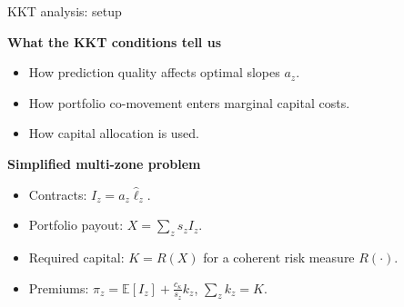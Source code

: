 \documentclass{beamer}
\begin{document}
    \begin{frame}{KKT analysis: setup}
      \small

      \textbf{What the KKT conditions tell us}
      \begin{itemize}\itemsep2pt
          \item How prediction quality affects optimal slopes $a_z$.
          \item How portfolio co-movement enters marginal capital costs.
          \item How capital allocation is used.
      \end{itemize}

      \medskip

      \textbf{Simplified multi-zone problem}
      \begin{itemize}\itemsep2pt
          \item Contracts: $I_z = a_z \hat{\ell}_z$.
          \item Portfolio payout: $X = \sum_z s_z I_z$.
          \item Required capital: $K = R(X)$ for a coherent risk measure $R(\cdot)$.
          \item Premiums: $\pi_z = \mathbb{E}[I_z] + \frac{c_\kappa}{s_z} k_z$, \quad $\sum_z k_z = K$.
      \end{itemize}
      
      
      \end{frame}
\end{document}
